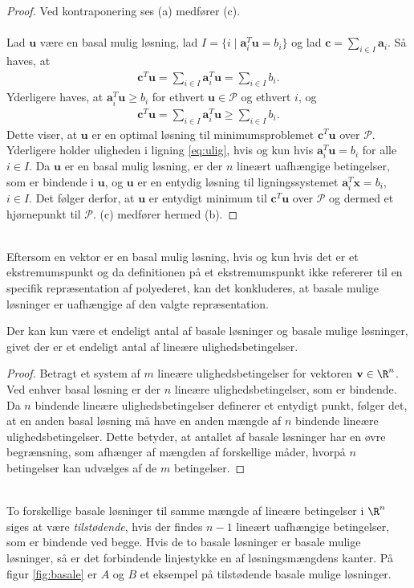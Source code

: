 \begin{proof}
Ved kontraponering ses (a) medfører (c).
\\\\
%
Lad $\textbf{u}$ være en basal mulig løsning, lad $I = \{i \mid \textbf{a}_i^T\textbf{u} = b_i \}$ og lad $\textbf{c}=\sum_{i \in I} \textbf{a}_i$.
Så haves, at
%
\begin{align*}
\textbf{c}^T\textbf{u} = \sum_{i\in I}\textbf{a}_i^T\textbf{u} = \sum_{i\in I}b_i.
\end{align*}
%
Yderligere haves, at $\textbf{a}_i^T\textbf{u} \geq b_i$ for ethvert $\textbf{u} \in \mathcal{P}$ og ethvert $i$, og 
%
\begin{align}\label{eq:ulig}
\textbf{c}^T\textbf{u} = \sum_{i\in I}\textbf{a}_i^T\textbf{u} \geq \sum_{i\in I}b_i.
\end{align}
%
Dette viser, at $\textbf{u}$ er en optimal løsning til minimumsproblemet $\textbf{c}^T\textbf{u}$ over $\mathcal{P}$.
Yderligere holder uligheden i ligning \ref{eq:ulig}, hvis og kun hvis $\textbf{a}_i^T\textbf{u} = b_i$ for alle $i \in I$.
Da $\textbf{u}$ er en basal mulig løsning, er der $n$ lineært uafhængige betingelser, som er bindende i $\textbf{u}$, og $\textbf{u}$ er en entydig løsning til ligningssystemet $\textbf{a}_i^T\textbf{x} = b_i$, $i \in I$.
Det følger derfor, at $\textbf{u}$ er entydigt minimum til $\textbf{c}^T\textbf{u}$ over $\mathcal{P}$ og dermed et hjørnepunkt til $\mathcal{P}$.
(c) medfører hermed (b).
%
\end{proof}\\
%
Eftersom en vektor er en basal mulig løsning, hvis og kun hvis det er et ekstremumspunkt og da definitionen på et ekstremumspunkt ikke refererer til en specifik repræsentation af polyederet, kan det konkluderes, at basale mulige løsninger er uafhængige af den valgte repræsentation.
%
\begin{kor}{}{}
Der kan kun være et endeligt antal af basale løsninger og basale mulige løsninger, givet der er et endeligt antal af lineære ulighedsbetingelser.
\end{kor}
%
\begin{proof}
Betragt et system af $m$ lineære ulighedsbetingelser for vektoren $\textbf{v} \in \R^n$.
Ved enhver basal løsning er der $n$ lineære ulighedsbetingelser, som er bindende.
Da $n$ bindende lineære ulighedsbetingelser definerer et entydigt punkt, følger det, at en anden basal løsning må have en anden mængde af $n$ bindende lineære ulighedsbetingelser.
Dette betyder, at antallet af basale løsninger har en øvre begrænsning, som afhænger af mængden af forskellige måder, hvorpå $n$ betingelser kan udvælges af de $m$ betingelser.
\end{proof}\\
%
To forskellige basale løsninger til samme mængde af lineære betingelser i $\R^n$ siges at være \textit{tilstødende}, hvis der findes $n-1$ lineært uafhængige betingelser, som er bindende ved begge. 
Hvis de to basale løsninger er basale mulige løsninger, så er det forbindende linjestykke en af løsningsmængdens kanter.
På figur \ref{fig:basale} er $A$ og $B$ et eksempel på tilstødende basale mulige løsninger.
